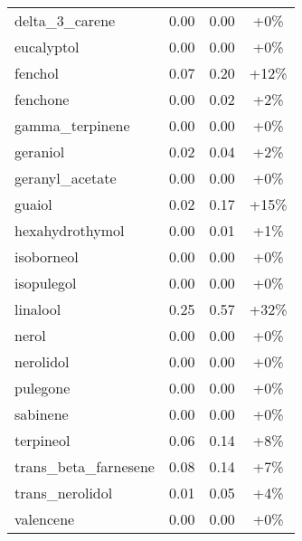 \begin{table}[H]
\begin{tabular}{lccc}
delta\_3\_carene & 0.00 & 0.00 & +0\% \\
eucalyptol & 0.00 & 0.00 & +0\% \\
fenchol & 0.07 & 0.20 & +12\% \\
fenchone & 0.00 & 0.02 & +2\% \\
gamma\_terpinene & 0.00 & 0.00 & +0\% \\
geraniol & 0.02 & 0.04 & +2\% \\
geranyl\_acetate & 0.00 & 0.00 & +0\% \\
guaiol & 0.02 & 0.17 & +15\% \\
hexahydrothymol & 0.00 & 0.01 & +1\% \\
isoborneol & 0.00 & 0.00 & +0\% \\
isopulegol & 0.00 & 0.00 & +0\% \\
linalool & 0.25 & 0.57 & +32\% \\
nerol & 0.00 & 0.00 & +0\% \\
nerolidol & 0.00 & 0.00 & +0\% \\
pulegone & 0.00 & 0.00 & +0\% \\
sabinene & 0.00 & 0.00 & +0\% \\
terpineol & 0.06 & 0.14 & +8\% \\
trans\_beta\_farnesene & 0.08 & 0.14 & +7\% \\
trans\_nerolidol & 0.01 & 0.05 & +4\% \\
valencene & 0.00 & 0.00 & +0\% \\
\hline
\end{tabular}
\end{table}
